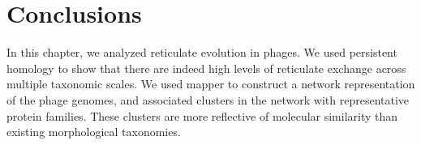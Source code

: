 \section{Conclusions}
\label{phage:sec:conclusions}

In this chapter, we analyzed reticulate evolution in phages.
We used persistent homology to show that there are indeed high levels of reticulate exchange across multiple taxonomic scales.
We used mapper to construct a network representation of the phage genomes, and associated clusters in the network with representative protein families.
These clusters are more reflective of molecular similarity than existing morphological taxonomies.